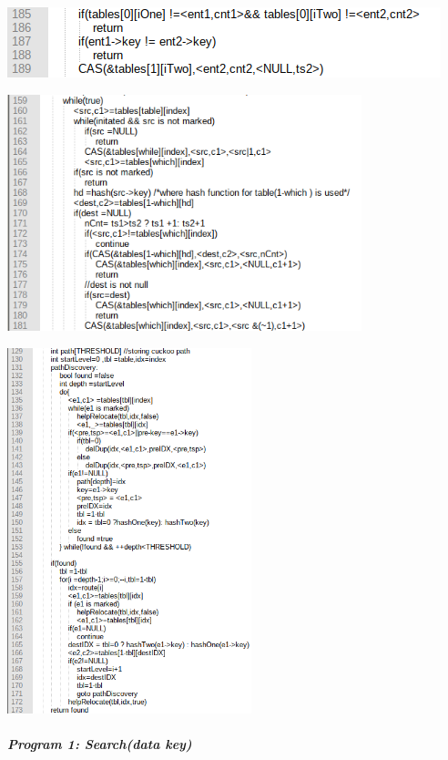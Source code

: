 \documentclass{article}
\begin{document}
\bigskip


\bigskip


\bigskip


\bigskip


\bigskip


\bigskip


\bigskip


\bigskip


\bigskip


\bigskip


\bigskip

 \includegraphics[width=4.9583in,height=0.802in]{Report-img006.png} 

\begin{center}
\includegraphics[width=4.052in,height=2.7071in]{Report-img007.png}
\end{center}
\begin{center}
\includegraphics[width=2.7917in,height=4.1783in]{Report-img008.png}
\end{center}
\subparagraph[Program 1: Search(data key)]{Program 1: Search(data key)}
\end{document}
